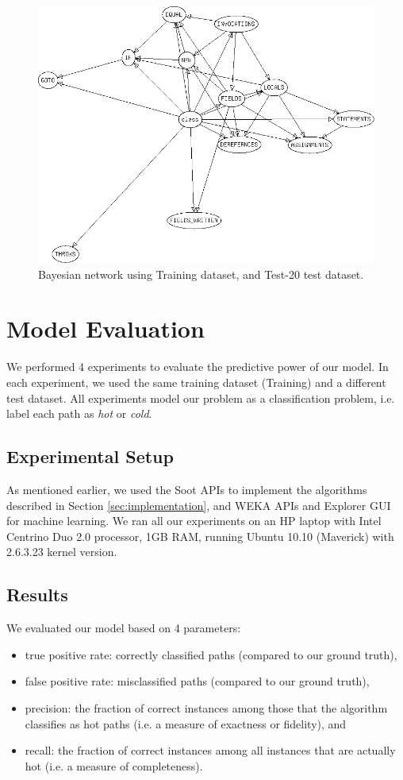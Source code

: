 \documentclass[10pt,twocolumn,letterpaper]{article}
\begin{document}
\begin{figure}[t!]
\centering
\includegraphics[width=\textwidth]{imgs/bayes.png}
\caption{Bayesian network using Training dataset, and Test-20 test dataset.}
\label{fig:bayes}
\end{figure}

\section{Model Evaluation}
\label{sec:results}
We performed 4 experiments to evaluate the predictive power of our model. In each experiment, we used the same training dataset (Training) and a different test
dataset. All experiments model our problem as a classification problem, i.e. label each path as \textit{hot} or \textit{cold}.

\subsection{Experimental Setup}
As mentioned earlier, we used the Soot \cite{vallee1999soot} APIs to implement the algorithms described in Section \ref{sec:implementation}, and WEKA
\cite{hall2009weka} APIs and Explorer GUI for machine learning. We ran all our experiments on an HP laptop with Intel Centrino Duo 2.0 processor, 1GB RAM,
running Ubuntu 10.10 (Maverick) with 2.6.3.23 kernel version.

\subsection{Results}
We evaluated our model based on 4 parameters:
\begin{itemize}
  \item true positive rate: correctly classified paths (compared to our ground truth),
  \item false positive rate: misclassified paths (compared to our ground truth),
  \item precision: the fraction of correct instances among those that the algorithm classifies as hot paths (i.e. a measure of exactness or fidelity), and
  \item recall: the fraction of correct instances among all instances that are actually hot (i.e. a measure of completeness).
\end{itemize}
\end{document}
